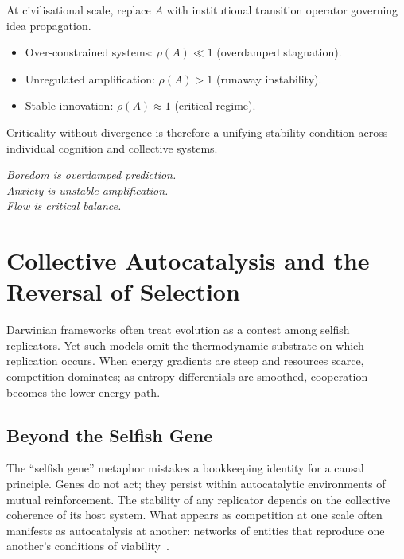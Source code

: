 \documentclass[12pt,a4paper]{article}
\theoremstyle{definition}
\begin{document}
At civilisational scale,
replace $A$ with institutional transition operator
governing idea propagation.

\begin{itemize}
  \item Over-constrained systems:
        $\rho(A) \ll 1$ (overdamped stagnation).
  \item Unregulated amplification:
        $\rho(A) > 1$ (runaway instability).
  \item Stable innovation:
        $\rho(A) \approx 1$ (critical regime).
\end{itemize}

Criticality without divergence is therefore
a unifying stability condition across
individual cognition and collective systems.

\medskip
\begin{center}
  \itshape
  Boredom is overdamped prediction.\\
  Anxiety is unstable amplification.\\
  Flow is critical balance.
\end{center}


\section{Collective Autocatalysis and the Reversal of Selection}
\label{sec:autocatalysis}

Darwinian frameworks often treat evolution as a contest among selfish
replicators.  Yet such models omit the thermodynamic substrate on which
replication occurs.  When energy gradients are steep and resources scarce,
competition dominates; as entropy differentials are smoothed, cooperation
becomes the lower-energy path.

\subsection{Beyond the Selfish Gene}

The ``selfish gene'' metaphor mistakes a bookkeeping identity for a causal
principle.  Genes do not act; they persist within autocatalytic environments
of mutual reinforcement.  The stability of any replicator depends on the
collective coherence of its host system.  What appears as competition at one
scale often manifests as autocatalysis at another: networks of entities that
reproduce one another's conditions of viability~\citep{capraluisi2021,morin2008}.
\end{document}
